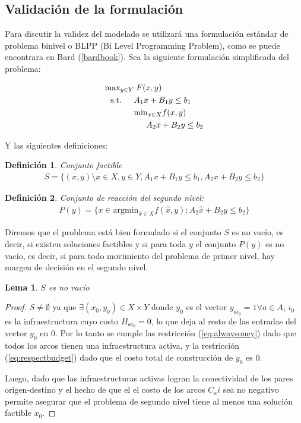 \documentclass{article}
\newtheorem{definition}{Definición}
\newtheorem{lemma}{Lema}
\newcommand{\modelspace}{\hspace{1.5em}}
\begin{document}
  \subsection*{Validación de la formulación}

  Para discutir la validez del modelado se utilizará una formulación estándar de problema binivel o BLPP (Bi Level Programming Problem), como se puede encontrara en Bard (\ref{bardbook}).
  Sea la siguiente formulación simplificada del problema:

  \begin{align}
    \text{max}_{y \in Y}    & \; F(x, y) \\
    \text{s.t.} \modelspace & A_1 x + B_1 y \leq b_1 \\
                            & \text{min}_{x \in X} f(x, y) \\
                            & \modelspace A_2 x + B_2 y \leq b_2
  \end{align}

  Y las siguientes definiciones:

  \begin{definition}
    Conjunto factible
    \begin{align}
      S = \{(x, y) \setminus x \in X, y \in Y, A_1 x + B_1 y \leq b_1, A_2 x + B_2 y \leq b_2 \}
    \end{align}
  \end{definition}

  \begin{definition}
    Conjunto de reacción del segundo nivel:
    \begin{align}
      P(y) = \{ x \in \text{argmin}_{\hat{x} \in X} f(\hat{x}, y) : A_2 \hat{x} + B_2 y \leq b_2 \}
    \end{align}
  \end{definition}

  Diremos que el problema está bien formulado si el conjunto $S$ es no vacío, es decir, si existen soluciones factibles y si para toda $y$ el conjunto $P(y)$ es no vacío, es decir, si para todo movimiento del problema de primer nivel, hay margen de decisión en el segundo nivel.

  \begin{lemma}$S$ es no vacío
  \end{lemma}

  \begin{proof}
    $S \neq \emptyset$ ya que $\exists (x_0, y_0) \in X \times Y$ donde $y_0$ es el vector $y_{ai_0} = 1 \forall a \in A$, $i_0$ es la infraestructura cuyo costo $H_{ai_0} = 0$, lo que deja al resto de las entradas del vector $y_0$ en $0$. Por lo tanto se cumple las restricción (\ref{eq:alwaysoney}) dado que todos los arcos tienen una infraestructura activa, y la restricción (\ref{eq:respectbudget}) dado que el costo total de construcción de $y_0$ es $0$.

    Luego, dado que las infraestructuras activas logran la conectividad de los pares origen-destino y el hecho de que el el costo de los arcos $C_ai$ sea no negativo permite asegurar que el problema de segundo nivel tiene al menos una solución factible $x_0$.
  \end{proof}
\end{document}
